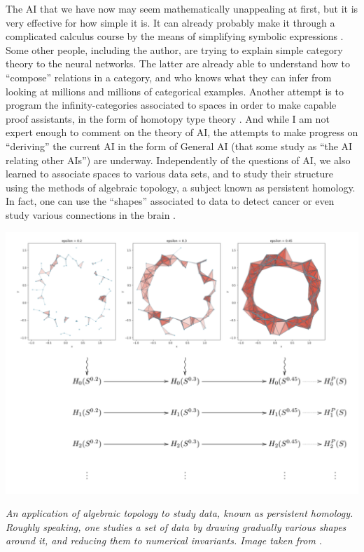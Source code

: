 \documentclass{article}
\begin{document}
The AI that we have now may seem mathematically unappealing at first, but it is very effective for how simple it is. It can already probably make it through a complicated calculus course by the means of simplifying symbolic expressions \cite{LAMPCHART}. Some other people, including the author, are trying to explain simple category theory to the neural networks. The latter are already able to understand how to ``compose'' relations
in a category, and who knows what they can infer from looking at millions and millions of categorical examples.
Another attempt is to program the infinity-categories associated to spaces in order to make capable proof assistants, in the form of homotopy type theory \cite{HOTT}. And while I am not expert enough to comment on the theory of AI, the attempts to make progress on “deriving” the current AI in the form of General AI (that some study as ``the AI relating other AIs'') are underway.
Independently of the questions of AI, we also learned to associate spaces to various data sets, and to study their structure
using the methods of algebraic topology, a subject known as persistent homology. In
fact, one can use the ``shapes'' associated to data to detect cancer \cite{LAWSON} or
even study various connections in the brain \cite{PETRI}.

\begin{center}
\includegraphics[scale=0.52]{noisy_circle_simplexes_and_persistent_homology.png}

\textit{An application of algebraic topology to study data, known as persistent homology. Roughly speaking, one studies a set of data by drawing gradually various shapes around it, and reducing them to numerical invariants. Image taken from \cite{BUNCH}}.
\end{center}
\end{document}
